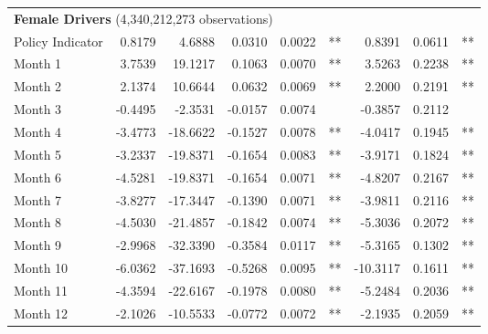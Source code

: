 \begin{table}
\begin{tabular}{l r r r r l r r l}
\hline 

\multicolumn{7}{l}{\textbf{Female Drivers} (4,340,212,273 observations)} \\ 

Policy Indicator          &  0.8179        &  4.6888       &  0.0310        &  0.0022       &   **       &  0.8391        &  0.0611       &   **       \\ 
Month 1                         &  3.7539        &  19.1217       &  0.1063        &  0.0070       &   **       &  3.5263        &  0.2238       &   **       \\ 
Month 2                         &  2.1374        &  10.6644       &  0.0632        &  0.0069       &   **       &  2.2000        &  0.2191       &   **       \\ 
Month 3                         &  -0.4495        &  -2.3531       &  -0.0157        &  0.0074       &            &  -0.3857        &  0.2112       &            \\ 
Month 4                         &  -3.4773        &  -18.6622       &  -0.1527        &  0.0078       &   **       &  -4.0417        &  0.1945       &   **       \\ 
Month 5                         &  -3.2337        &  -19.8371       &  -0.1654        &  0.0083       &   **       &  -3.9171        &  0.1824       &   **       \\ 
Month 6                         &  -4.5281        &  -19.8371       &  -0.1654        &  0.0071       &   **       &  -4.8207        &  0.2167       &   **       \\ 
Month 7                         &  -3.8277        &  -17.3447       &  -0.1390        &  0.0071       &   **       &  -3.9811        &  0.2116       &   **       \\ 
Month 8                         &  -4.5030        &  -21.4857       &  -0.1842        &  0.0074       &   **       &  -5.3036        &  0.2072       &   **       \\ 
Month 9                         &  -2.9968        &  -32.3390       &  -0.3584        &  0.0117       &   **       &  -5.3165        &  0.1302       &   **       \\ 
Month 10                        &  -6.0362        &  -37.1693       &  -0.5268        &  0.0095       &   **       &  -10.3117        &  0.1611       &   **       \\ 
Month 11                        &  -4.3594        &  -22.6167       &  -0.1978        &  0.0080       &   **       &  -5.2484        &  0.2036       &   **       \\ 
Month 12                        &  -2.1026        &  -10.5533       &  -0.0772        &  0.0072       &   **       &  -2.1935        &  0.2059       &   **       \\ 


\end{tabular}
\end{table}
